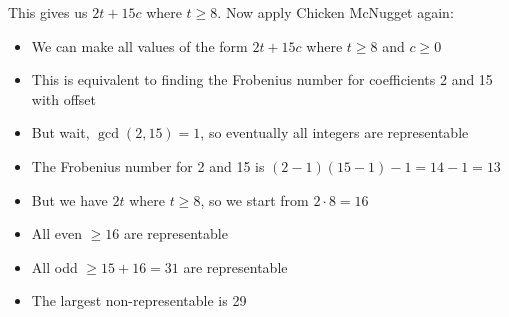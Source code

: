 \documentclass[12pt]{article}
\begin{document}
\begin{solutionbox}
This gives us $2t + 15c$ where $t \geq 8$. Now apply Chicken McNugget again:
\begin{itemize}
    \item We can make all values of the form $2t + 15c$ where $t \geq 8$ and $c \geq 0$
    \item This is equivalent to finding the Frobenius number for coefficients 2 and 15 with offset
    \item But wait, $\gcd(2, 15) = 1$, so eventually all integers are representable
    \item The Frobenius number for 2 and 15 is $(2-1)(15-1) - 1 = 14 - 1 = 13$
    \item But we have $2t$ where $t \geq 8$, so we start from $2 \cdot 8 = 16$
    \item All even $\geq 16$ are representable
    \item All odd $\geq 15 + 16 = 31$ are representable
    \item The largest non-representable is 29
\end{itemize}

\end{solutionbox}
\end{document}

